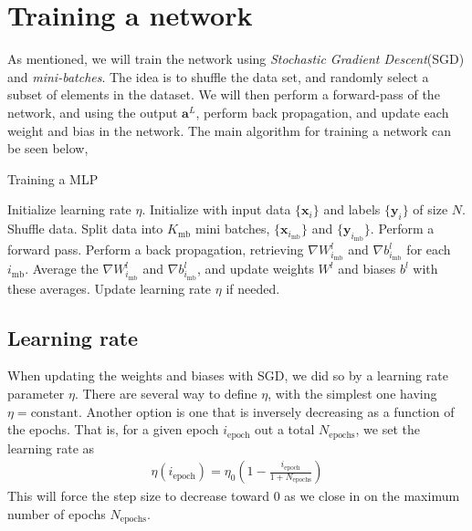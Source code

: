 \documentclass[a4paper,10pt]{article}
\begin{document}
\section{Training a network}
As mentioned, we will train the network using \textit{Stochastic Gradient Descent}(SGD) and \textit{mini-batches}. The idea is to shuffle the data set, and randomly select a subset of elements in the dataset. We will then perform a forward-pass of the network, and using the output $\bm{a}^L$, perform back propagation, and update each weight and bias in the network. The main algorithm for training a network can be seen below,
\begin{algorithm}[H]
    \caption{Training a MLP}
    \label{alg:mlp-training}
    \begin{algorithmic}[1]
        \State Initialize learning rate $\eta$.
        \State Initialize with input data $\{\bm{x}_i\}$ and labels $\{\bm{y}_i\}$ of size $N$.
            \State Shuffle data.
            \State Split data into $K_\mathrm{mb}$ mini batches, $\{\bm{x}_{i_\mathrm{mb}}\}$ and $\{\bm{y}_{i_\mathrm{mb}}\}$.
                \State Perform a forward pass.
                \State Perform a back propagation, retrieving $\nabla W^l_{i_\mathrm{mb}}$ and $\nabla b^l_{i_\mathrm{mb}}$ for each $i_\mathrm{mb}$.
            \EndFor
            \State Average the $\nabla W^l_{i_\mathrm{mb}}$ and $\nabla b^l_{i_\mathrm{mb}}$, and update weights $W^l$ and biases $b^l$ with these averages.
            \State Update learning rate $\eta$ if needed.
        \EndFor
    \end{algorithmic}
\end{algorithm}


\subsection{Learning rate}
When updating the weights and biases with SGD, we did so by a learning rate parameter $\eta$. There are several way to define $\eta$, with the simplest one having $\eta=\mathrm{constant}$. Another option is one that is inversely decreasing as a function of the epochs. That is, for a given epoch $i_\mathrm{epoch}$ out a total $N_\mathrm{epochs}$, we set the learning rate as
\begin{align}
    \eta(i_\mathrm{epoch}) = \eta_0 \left(1 - \frac{i_\mathrm{epoch}}{1 + N_\mathrm{epochs}}\right)
    \label{eq:inverse-eta}
\end{align}
This will force the step size to decrease toward 0 as we close in on the maximum number of epochs $N_\mathrm{epochs}$.
\end{document}
